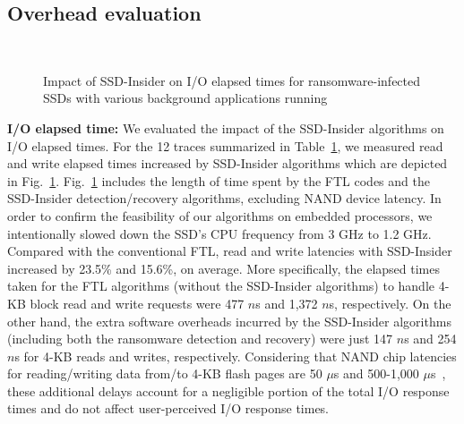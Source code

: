 \documentclass[conference]{IEEEtran}
\newcommand{\ours}{SSD-Insider}
\begin{document}
\subsection{Overhead evaluation}\label{sec:oeval}
\begin{figure}[b!]
	\centering 
	 \\
	\caption{Impact of \ours{} on I/O elapsed times for ransomware-infected SSDs with various background applications running}
	\label{fig:flash-avg-resp}
\end{figure}
{\bf I/O elapsed time:} 
We evaluated the impact of the \ours{} algorithms on I/O elapsed
times.  For the 12 traces summarized in
Table~\ref{fig:flash-avg-resp}, we measured read and write elapsed
times increased by \ours{} algorithms which are depicted in
Fig.~\ref{fig:flash-avg-resp}.  Fig.~\ref{fig:flash-avg-resp}
includes the length of time spent by the FTL codes and the \ours{}
detection/recovery algorithms, excluding NAND device latency.  In
order to confirm the feasibility of our algorithms on embedded
processors, we intentionally slowed down the SSD's CPU frequency
from 3 GHz to 1.2 GHz.  Compared with the conventional FTL, read
and write latencies with \ours{} increased by 23.5\% and 15.6\%, on
average.  More specifically, the elapsed times taken for the FTL
algorithms (without the \ours{} algorithms) to handle 4-KB block
read and write requests were 477 $n$s and 1,372 $n$s, respectively.
On the other hand, the extra software overheads incurred by the
\ours{} algorithms (including both the ransomware detection and
recovery) were just 147 $n$s and 254 $n$s for 4-KB reads and
writes, respectively. Considering that NAND chip latencies for
reading/writing data from/to 4-KB flash pages are 50 $\mu$s and
500-1,000 $\mu$s~\cite{micron-nand}, these additional delays
account for a negligible portion of the total I/O response times
and do not affect user-perceived I/O response times.
\end{document}
